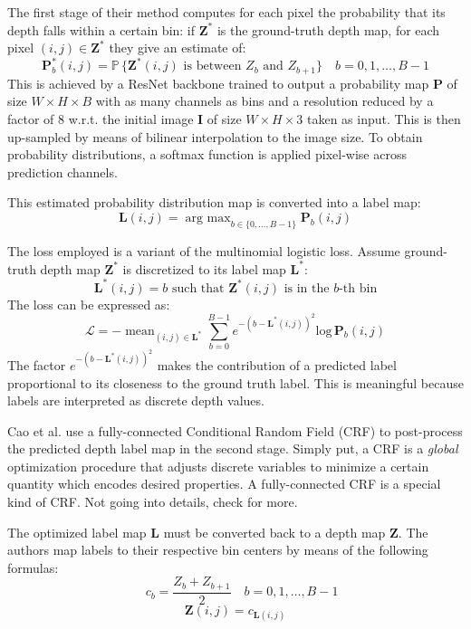 The first stage of their method computes for each pixel the probability that its depth falls within a certain bin: if $\mathbf{Z}^{*}$ is the ground-truth depth map, for each pixel $(i, j) \in \mathbf{Z}^{*}$ they give an estimate of:
\[
	\mathbf{P}^{*}_{b}(i, j) = \mathbb{P} \, \{\mathbf{Z}^{*}(i, j) \text{ is between } Z_{b} \text{ and } Z_{b+1}\} \quad b = 0, 1, \dotsc, B-1
\]
This is achieved by a ResNet \cite{ResNet} backbone trained to output a probability map $\mathbf{P}$ of size $W \times H \times B$ with as many channels as bins and a resolution reduced by a factor of 8 w.r.t. the initial image $\mathbf{I}$ of size $W \times H \times 3$ taken as input.
This is then up-sampled by means of bilinear interpolation to the image size.
To obtain probability distributions, a softmax function is applied pixel-wise across prediction channels.

This estimated probability distribution map is converted into a label map:
\[
	\mathbf{L}(i, j) = \mathop{\text{arg max}}_{b \in \{ 0, \dotsc, B-1\}} \mathbf{P}_{b}(i, j)
\]

The loss employed is a variant of the multinomial logistic loss.
Assume ground-truth depth map $\mathbf{Z}^{*}$ is discretized to its label map $\mathbf{L}^{*}$:
\[
	\mathbf{L}^{*}(i, j) = b \text{ such that } \mathbf{Z}^{*}(i, j) \text{ is in the } b\text{-th bin}
\]
The loss can be expressed as:
\[
	\mathcal{L} =
		- \mathop{\text{mean}}_{(i, j) \in \mathbf{L}^{*}}
		\sum_{b = 0}^{B-1}
		e^{-(b - \mathbf{L}^{*}(i, j))^{2}}
		\text{log} \, \mathbf{P}_{b}(i, j)
\]
The factor $e^{-(b - \mathbf{L}^{*}(i, j))^{2}}$ makes the contribution of a predicted label proportional to its closeness to the ground truth label.
This is meaningful because labels are interpreted as discrete depth values.

Cao et al. use a fully-connected Conditional Random Field (CRF) to post-process the predicted depth label map in the second stage.
Simply put, a CRF is a \textit{global} optimization procedure that adjusts discrete variables to minimize a certain quantity which encodes desired properties.
A fully-connected CRF is a special kind of CRF.
Not going into details, check \cite{computer_vision} for more.

The optimized label map $\mathbf{L}$ must be converted back to a depth map $\mathbf{Z}$.
The authors map labels to their respective bin centers by means of the following formulas:
\[
	\quad c_{b} = \frac{Z_{b} + Z_{b+1}}{2} \quad b = 0, 1, \dotsc, B-1
\]\[
	\mathbf{Z}(i, j) = c_{\mathbf{L}(i, j)}
\]

